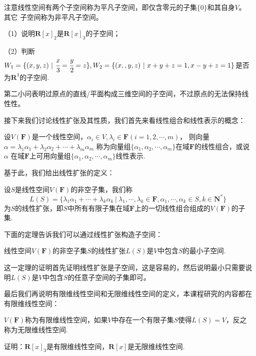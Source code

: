 注意线性空间有两个子空间称为平凡子空间，即仅含零元的子集$\{0\}$和其自身$V$。其它
子空间称为非平凡子空间。
\begin{example}
	\textup{（1）}说明$\mathbf{R}[x]_2$是$\mathbf{R}[x]_3$的子空间\textup{；}

	\textup{（2）}判断$W_1=\{(x,y,z)\ |\ \cfrac{x}{3}=\cfrac{y}{2}=z\},
	W_2=\{(x,,y,z)\ |\ x+y+z=1,x-y+z=1\}$是否为$\mathbf{R}^3$的子空间.
\end{example}
第二小问表明过原点的直线/平面构成三维空间的子空间，不过原点的无法保持线性性。

接下来我们讨论线性扩张及其性质，我们首先来看线性组合和线性表示的概念：
\begin{definition}
	设$V(\mathbf{F})$是一个线性空间，$\alpha_i\in V,\lambda_i\in \mathbf{F}(i=1,2,\cdots,m)$，
	则向量$\alpha=\lambda_1\alpha_1+\lambda_2\alpha_2+\cdots+\lambda_m\alpha_m$
	称为向量组$\{\alpha_1,\alpha_2,\cdots,\alpha_m\}$在域$\mathbf{F}$的线性组合，或说$\alpha$
	在域$\mathbf{F}$上可用向量组$\{\alpha_1,\alpha_2,\cdots,\alpha_m\}$线性表示.
\end{definition}
基于此，我们给出线性扩张的定义：
\begin{definition}
	设$S$是线性空间$V(\mathbf{F})$的非空子集，我们称
	$$L(S)=\{\lambda_1\alpha_1+\cdots+\lambda_k\alpha_k\ |\ \lambda_1,\cdots,\lambda_k\in\mathbf{F},\alpha_1,\cdots,\alpha_k\in S,k\in\mathbf{N^*}\}$$
	为$S$的线性扩张，即$S$中所有有限子集在域$\mathbf{F}$上的一切线性组合组成的$V(\mathbf{F})$的子集.
\end{definition}
下面的定理告诉我们可以通过线性扩张构造子空间：
\begin{theorem}
	线性空间$V(\mathbf{F})$的非空子集$S$的线性扩张$L(S)$是$V$中包含$S$的最小子空间.
\end{theorem}
这一定理的证明首先证明线性扩张是子空间，这是容易的，然后说明最小只需要说明$L(S)$是$V$中包含$S$的任意子空间的子集即可。

最后我们再说明有限维线性空间和无限维线性空间的定义，本课程研究的内容都在有限维线性空间：
\begin{definition}
	$V(\mathbf{F})$称为有限维线性空间，如果$V$中存在一个有限子集$S$使得$L(S)=V$，反之称为无限维线性空间.
\end{definition}
\begin{example}
	证明：$\mathbf{R}[x]_3$是有限维线性空间，$\mathbf{R}[x]$是无限维线性空间.
\end{example}

